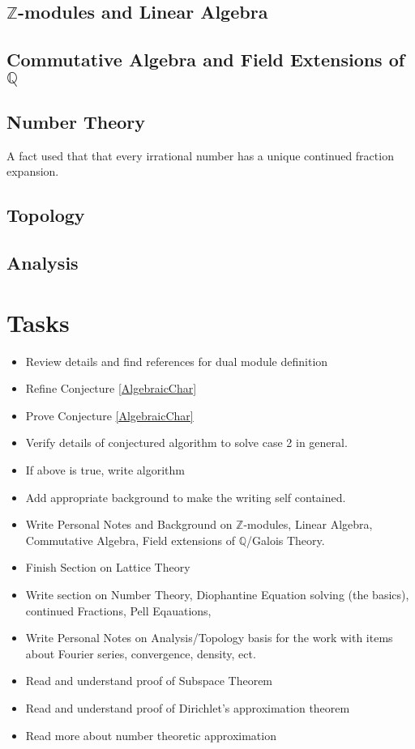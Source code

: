 \documentclass{article}
\newcommand{\Z}[0]{\mathbb{Z}}		%
\newcommand{\Q}[0]{\mathbb{Q}}		%
\theoremstyle{definition}
\theoremstyle{remark}
\begin{document}
\subsection{$\Z$-modules and Linear Algebra}

\subsection{Commutative Algebra and Field Extensions of $\Q$}
\subsection{Number Theory}
A fact used that that every irrational number has a unique continued fraction expansion.




\subsection{Topology}
\subsection{Analysis}

\section{Tasks}
\begin{itemize}
    \item Review details and find references for dual module definition
    \item Refine Conjecture \ref{AlgebraicChar}
    \item Prove Conjecture \ref{AlgebraicChar}
    \item Verify details of conjectured algorithm to solve case 2 in general.
    \item If above is true, write algorithm
    \item Add appropriate background to make the writing self contained.
    \item Write Personal Notes and Background on $\Z$-modules, Linear Algebra, Commutative Algebra, Field extensions of $\Q$/Galois Theory.
    \item Finish Section on Lattice Theory
    \item Write section on Number Theory, Diophantine Equation solving (the basics), continued Fractions, Pell Eqauations, 
    \item Write Personal Notes on Analysis/Topology basis for the work with items about Fourier series, convergence, density, ect.
    \item Read and understand proof of Subspace Theorem
    \item Read and understand proof of Dirichlet's approximation theorem
    \item Read more about number theoretic approximation
\end{itemize}
\end{document}
